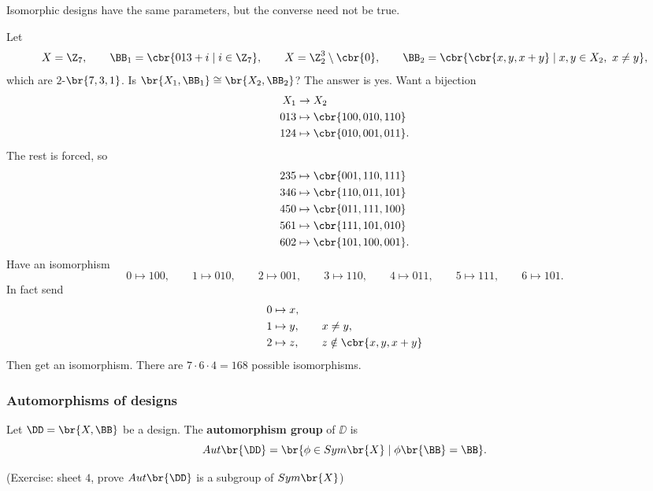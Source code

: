 \begin{note*}
Isomorphic designs have the same parameters, but the converse need not be true.
\end{note*}

\begin{example*}
Let
$$ X = \Z_7, \qquad \BB_1 = \cbr{013 + i \mid i \in \Z_7}, \qquad X = \Z_2^3 \setminus \cbr{0}, \qquad \BB_2 = \cbr{\cbr{x, y, x + y} \mid x, y \in X_2, \ x \ne y}, $$
which are $ 2 $-$ \br{7, 3, 1} $. Is $ \br{X_1, \BB_1} \cong \br{X_2, \BB_2} $? The answer is yes. Want a bijection
\begin{align*}
X_1 & \to X_2 \\
013 & \mapsto \cbr{100, 010, 110} \\
124 & \mapsto \cbr{010, 001, 011}.
\end{align*}
The rest is forced, so
\begin{align*}
235 & \mapsto \cbr{001, 110, 111} \\
346 & \mapsto \cbr{110, 011, 101} \\
450 & \mapsto \cbr{011, 111, 100} \\
561 & \mapsto \cbr{111, 101, 010} \\
602 & \mapsto \cbr{101, 100, 001}.
\end{align*}
Have an isomorphism
$$ 0 \mapsto 100, \qquad 1 \mapsto 010, \qquad 2 \mapsto 001, \qquad 3 \mapsto 110, \qquad 4 \mapsto 011, \qquad 5 \mapsto 111, \qquad 6 \mapsto 101. $$
In fact send
\begin{align*}
0 & \mapsto x, \\
1 & \mapsto y, \qquad x \ne y, \\
2 & \mapsto z, \qquad z \notin \cbr{x, y, x + y}
\end{align*}
Then get an isomorphism. There are $ 7 \cdot 6 \cdot 4 = 168 $ possible isomorphisms.
\end{example*}

\subsubsection{Automorphisms of designs}

\begin{definition*}
Let $ \DD = \br{X, \BB} $ be a design. The \textbf{automorphism group} of $ \DD $ is
$$ Aut\br{\DD} = \br{\phi \in Sym\br{X} \mid \phi\br{\BB} = \BB}. $$
\end{definition*}

(Exercise: sheet $ 4 $, prove $ Aut\br{\DD} $ is a subgroup of $ Sym\br{X} $)

